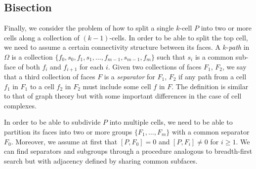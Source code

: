 \documentclass[twocolumn]{article}
\begin{document}
\subsection{Bisection}

Finally, we consider the problem of how to split a single $k$-cell $P$ into two or more cells along a collection of $(k - 1)$-cells.
In order to be able to split the top cell, we need to assume a certain connectivity structure between its faces.
A $k$-\emph{path} in $\Omega$ is a collection $\{f_0, s_0, f_1, s_1, \ldots, f_{m - 1}, s_{m - 1}, f_m\}$ such that $s_i$ is a common sub-face of both $f_i$ and $f_{i + 1}$ for each $i$.
Given two collections of faces $F_1$, $F_2$, we say that a third collection of faces $F$ is a \emph{separator} for $F_1$, $F_2$ if any path from a cell $f_1$ in $F_1$ to a cell $f_2$ in $F_2$ must include some cell $f$ in $F$.
The definition is similar to that of graph theory but with some important differences in the case of cell complexes.

In order to be able to subdivide $P$ into multiple cells, we need to be able to partition its faces into two or more groups $\{F_1, \ldots, F_m\}$ with a common separator $F_0$.
Moreover, we assume at first that $[P, F_0] = 0$ and $[P, F_i] \neq 0$ for $i \ge 1$.
We can find separators and subgroups through a procedure analogous to breadth-first search but with adjacency defined by sharing common subfaces.
\end{document}
